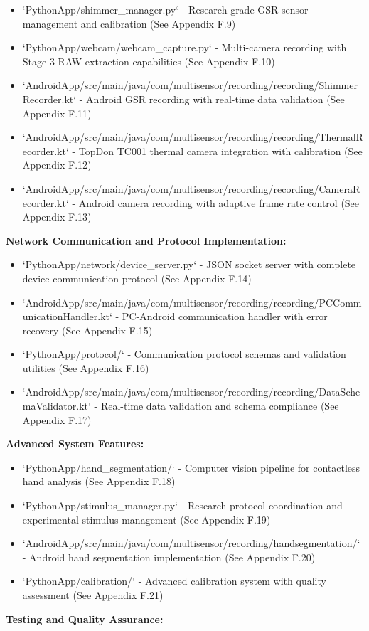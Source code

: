 \documentclass[11pt,a4paper]{article}
\begin{document}
\begin{itemize}
\item `PythonApp/shimmer_manager.py` - Research-grade GSR sensor management and calibration (See Appendix F.9)
\item `PythonApp/webcam/webcam_capture.py` - Multi-camera recording with Stage 3 RAW extraction capabilities (See
  Appendix F.10)
\item `AndroidApp/src/main/java/com/multisensor/recording/recording/ShimmerRecorder.kt` - Android GSR recording with
  real-time data validation (See Appendix F.11)
\item `AndroidApp/src/main/java/com/multisensor/recording/recording/ThermalRecorder.kt` - TopDon TC001 thermal camera
  integration with calibration (See Appendix F.12)
\item `AndroidApp/src/main/java/com/multisensor/recording/recording/CameraRecorder.kt` - Android camera recording with
  adaptive frame rate control (See Appendix F.13)

\end{itemize}
\textbf{Network Communication and Protocol Implementation:}

\begin{itemize}
\item `PythonApp/network/device_server.py` - JSON socket server with complete device communication protocol (See
  Appendix F.14)
\item `AndroidApp/src/main/java/com/multisensor/recording/recording/PCCommunicationHandler.kt` - PC-Android communication
  handler with error recovery (See Appendix F.15)
\item `PythonApp/protocol/` - Communication protocol schemas and validation utilities (See Appendix F.16)
\item `AndroidApp/src/main/java/com/multisensor/recording/recording/DataSchemaValidator.kt` - Real-time data validation and
  schema compliance (See Appendix F.17)

\end{itemize}
\textbf{Advanced System Features:}

\begin{itemize}
\item `PythonApp/hand_segmentation/` - Computer vision pipeline for contactless hand analysis (See Appendix F.18)
\item `PythonApp/stimulus_manager.py` - Research protocol coordination and experimental stimulus management (See
  Appendix F.19)
\item `AndroidApp/src/main/java/com/multisensor/recording/handsegmentation/` - Android hand segmentation implementation (See
  Appendix F.20)
\item `PythonApp/calibration/` - Advanced calibration system with quality assessment (See Appendix F.21)

\end{itemize}
\textbf{Testing and Quality Assurance:}
\end{document}

